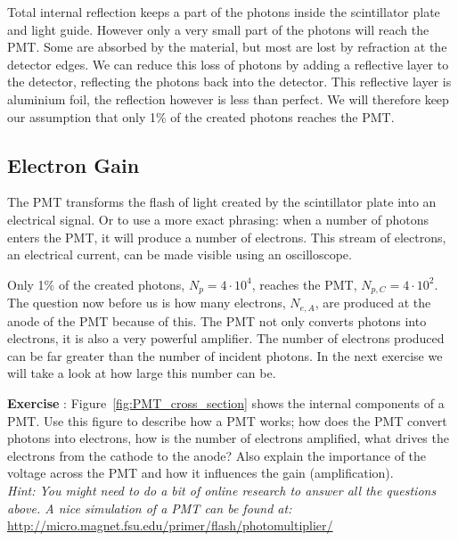 \documentclass[12pt,a4paper]{article}
\numberwithin{equation}{section}
\numberwithin{figure}{section}
\newcounter{Exercise}
\numberwithin{table}{section}
\begin{document}
Total internal reflection keeps a part of the photons inside the scintillator plate and light guide. However only a very small part of the photons will reach the PMT. Some are absorbed by the material, but most are lost by refraction at the detector edges. We can reduce this loss of photons by adding a reflective layer to the detector, reflecting the photons back into the detector. This reflective layer is aluminium foil, the reflection however is less than perfect. We will therefore keep our assumption that only 1\% of the created photons reaches the PMT.

\subsection{Electron Gain}
The PMT transforms the flash of light created by the scintillator plate into an electrical signal. Or to use a more exact phrasing: when a number of photons enters the PMT, it will produce a number of electrons. This stream of electrons, an electrical current, can be made visible using an oscilloscope.

Only 1\% of the created photons, $N_p=4 \cdot 10^4$, reaches the PMT, $N_{p,C}=4 \cdot 10^2$. The question now before us is how many electrons, $N_{e,A}$, are produced at the anode of the PMT because of this. The PMT not only converts photons into electrons, it is also a very powerful amplifier. The number of electrons produced can be far greater than the number of incident photons. In the next exercise we will take a look at how large this number can be.

\begin{shaded}
\textbf{Exercise \theExercise {}} : Figure~\ref{fig:PMT_cross_section} shows the internal components of a PMT. Use this figure to describe how a PMT works; how does the PMT convert photons into electrons, how is the number of electrons amplified, what drives the electrons from the cathode to the anode? Also explain the importance of the voltage across the PMT and how it influences the gain (amplification).\\
\emph{Hint: You might need to do a bit of online research to answer all the questions above. A nice simulation of a PMT can be found at:\\}
\url{http://micro.magnet.fsu.edu/primer/flash/photomultiplier/}
\end{shaded}
\end{document}
